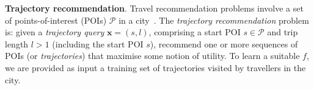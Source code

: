 


\textbf{Trajectory recommendation}.
Travel recommendation problems involve a set of points-of-interest (POIs) $\mathcal{P}$ in a city~\cite{bao2015recommendations,zheng2015trajectory,zheng2014urban}.
The \emph{trajectory recommendation} problem is: given a \emph{trajectory query} $\mathbf{x} = (s, l)$,
comprising a start POI $s \in \mathcal{P}$ and trip length
$l > 1$ (including the start POI $s$),
recommend one or more sequences of POIs (or \emph{trajectories}) %
that maximise some notion of utility.
To learn a suitable $f$,
we are provided as input a training set
of trajectories visited by travellers in the city.

